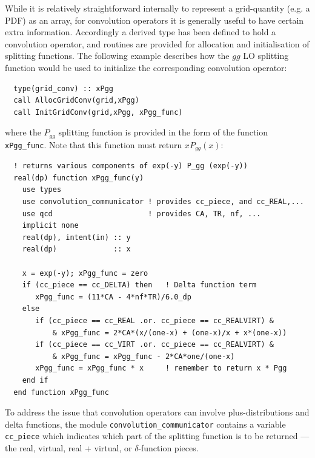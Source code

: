 \documentclass[12pt]{article}
\begin{document}
While it is relatively straightforward internally to represent a
grid-quantity (e.g. a PDF) as an array, for convolution
operators  it is generally useful to have certain extra
information. Accordingly a derived type has been defined to hold a
convolution operator, and routines are provided for allocation and
initialisation of splitting functions.
The following example describes how the $gg$ LO splitting function
would be used to initialize the corresponding 
convolution operator:
\begin{lstlisting}
  type(grid_conv) :: xPgg
  call AllocGridConv(grid,xPgg)
  call InitGridConv(grid,xPgg, xPgg_func)
\end{lstlisting}
where the $P_{gg}$ splitting function is provided in the form of the
function \texttt{xPgg\_func}. Note that this function
must return $xP_{gg}(x)$:
\begin{lstlisting}
  ! returns various components of exp(-y) P_gg (exp(-y))
  real(dp) function xPgg_func(y)
    use types
    use convolution_communicator ! provides cc_piece, and cc_REAL,...
    use qcd                      ! provides CA, TR, nf, ...
    implicit none
    real(dp), intent(in) :: y
    real(dp)             :: x

    x = exp(-y); xPgg_func = zero
    if (cc_piece == cc_DELTA) then   ! Delta function term
       xPgg_func = (11*CA - 4*nf*TR)/6.0_dp
    else
       if (cc_piece == cc_REAL .or. cc_piece == cc_REALVIRT) & 
           & xPgg_func = 2*CA*(x/(one-x) + (one-x)/x + x*(one-x))
       if (cc_piece == cc_VIRT .or. cc_piece == cc_REALVIRT) & 
           & xPgg_func = xPgg_func - 2*CA*one/(one-x)
       xPgg_func = xPgg_func * x     ! remember to return x * Pgg
    end if
  end function xPgg_func
\end{lstlisting}
To address the issue that convolution operators can involve
plus-distributions and delta functions, the module
\texttt{convolution\_communicator} contains a variable
\texttt{cc\_piece} which indicates which part of the splitting
function is to be returned --- the real, virtual, real + virtual, or
$\delta$-function pieces. 
\end{document}
